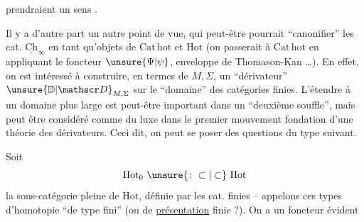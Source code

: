 prendraient un sens .

Il y a d'autre part un autre point de vue,
qui peut-être pourrait ``canonifier'' les
cat. $\underline{\mathrm{Ch}}_\infty$ en tant qu'objets de $\mathrm{Cat}\,\mathrm{hot}$
et   $\mathrm{Hot}$ (on passerait à $\mathrm{Cat}\,\mathrm{hot}$ en
appliquant le foncteur $\unsure{\Psi|\psi}$, enveloppe de Thomason-Kan \ldots). En effet, on est intéressé à
construire, en termes de $M,\Sigma$, un ``dérivateur''
 $\unsure{\mathbb D|\mathscr D}_{M,\Sigma}$  sur le ``domaine'' des catégories
finies. L'étendre à un domaine plus large
est peut-être important dans un ``deuxième
souffle'', mais peut être considéré comme
du luxe dans le premier mouvement  fondation
d'une théorie des dérivateurs. Ceci dit,
on peut se poser des questions du type suivant.

Soit 
\[
\mathrm{Hot}_0\ \unsure{\colon\subset|\subset}\ \mathrm{Hot}
\]
la sous-catégorie pleine de $\mathrm{Hot}$, définie par les
cat. finies -- appelons ces types d'homotopie ``de type
fini'' (ou de \uline{présentation} finie ?). On a un
foncteur évident
